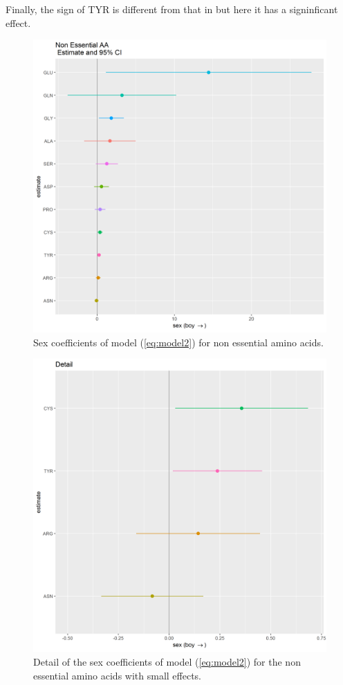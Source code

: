 \documentclass[12pt]{article}
\begin{document}
Finally, the sign of TYR is different from that in \cite{NutrientsDutch} but here it has a signinficant effect.

\begin{figure}[!htb]
  \includegraphics[width= \textwidth]{../sex/NEAA_coeff.png}
  \caption{Sex coefficients of model (\ref{eq:model2}) for non essential amino acids.}
  \label{fig:NEAA_coeff}
\end{figure}

\begin{figure}[!htb]
  \includegraphics[width= \textwidth]{../sex/NEAA_coeff_detail.png}
  \caption{Detail of the sex coefficients of model (\ref{eq:model2}) for the non essential amino acids with small effects.}
  \label{fig:NEAA_coeff_detail}
\end{figure}
\end{document}
